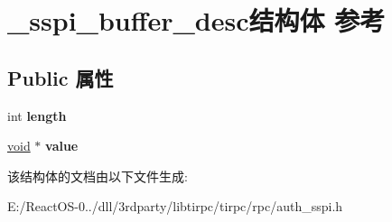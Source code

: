 \hypertarget{struct__sspi__buffer__desc}{}\section{\+\_\+sspi\+\_\+buffer\+\_\+desc结构体 参考}
\label{struct__sspi__buffer__desc}
\subsection*{Public 属性}
\begin{DoxyCompactItemize}
\item 
\mbox{\label{struct__sspi__buffer__desc_a3575eecdfff0146431bf0cb9c8da8ad2}} 
int {\bfseries length}
\item 
\mbox{\label{struct__sspi__buffer__desc_acaaa03482e6c6b3f6002e27bffc5384e}} 
\hyperlink{interfacevoid}{void} $\ast$ {\bfseries value}
\end{DoxyCompactItemize}


该结构体的文档由以下文件生成\+:\begin{DoxyCompactItemize}
\item 
E\+:/\+React\+O\+S-\/0../dll/3rdparty/libtirpc/tirpc/rpc/auth\+\_\+sspi.\+h\end{DoxyCompactItemize}
